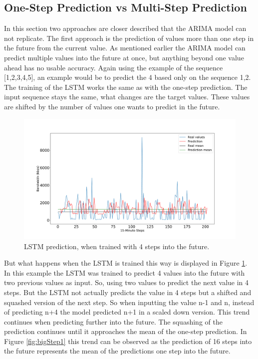 \subsection{One-Step Prediction vs Multi-Step Prediction}
In this section two approaches are closer described that the ARIMA model can not replicate.
The first approach is the prediction of values more than one step in the future from the current value.
As mentioned earlier the ARIMA model can predict multiple values into the future at once, but anything beyond one value ahead has no usable accuracy.
Again using the example of the sequence [1,2,3,4,5], an example would be to predict the 4 based only on the sequence 1,2.
The training of the LSTM works the same as with the one-step prediction.
The input sequence stays the same, what changes are the target values.
These values are shifted by the number of values one wants to predict in the future.
\begin{figure}
	\centering
	\includegraphics[width=1\linewidth]{Pictures/BigStep/LSTM_Big_Step_40}
	\caption{LSTM prediction, when trained with 4 steps into the future.}
	\label{fig:lstmbigstep0}
\end{figure}
But what happens when the LSTM is trained this way is displayed in Figure \ref{fig:lstmbigstep0}.
In this example the LSTM was trained to predict 4 values into the future with two previous values as input.
So, using two values to predict the next value in 4 steps.
But the LSTM not actually predicts the value in 4 steps but a shifted and squashed version of the next step.
So when inputting the value n-1 and n, instead of predicting n+4 the model predicted n+1 in a scaled down version.
This trend continues when predicting further into the future.
The squashing of the prediction continues until it approaches the mean of the one-step prediction.
In Figure \ref{fig:bigStep1} this trend can be observed as the prediction of 16 steps into the future represents the mean of the predictions one step into the future.

